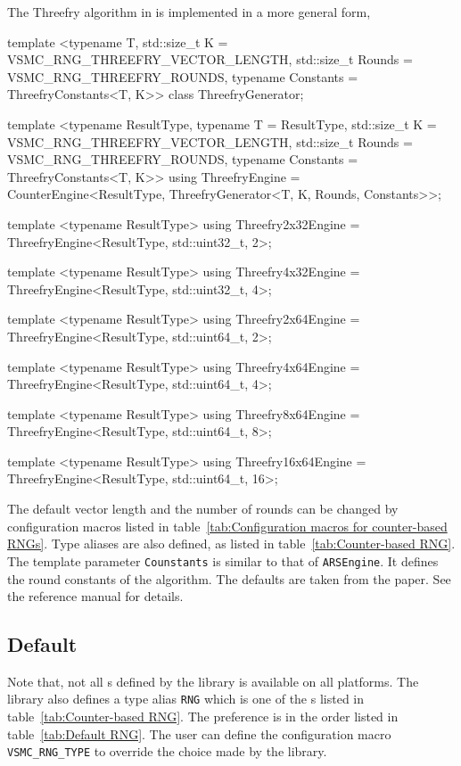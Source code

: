 The Threefry algorithm in \textcite{Salmon:2011um} is implemented in a more
general form,
\begin{cppcode}
  template <typename T, std::size_t K = VSMC_RNG_THREEFRY_VECTOR_LENGTH,
      std::size_t Rounds = VSMC_RNG_THREEFRY_ROUNDS,
      typename Constants = ThreefryConstants<T, K>>
  class ThreefryGenerator;

  template <typename ResultType, typename T = ResultType,
      std::size_t K = VSMC_RNG_THREEFRY_VECTOR_LENGTH,
      std::size_t Rounds = VSMC_RNG_THREEFRY_ROUNDS,
      typename Constants = ThreefryConstants<T, K>>
  using ThreefryEngine =
      CounterEngine<ResultType, ThreefryGenerator<T, K, Rounds, Constants>>;

  template <typename ResultType>
  using Threefry2x32Engine = ThreefryEngine<ResultType, std::uint32_t, 2>;

  template <typename ResultType>
  using Threefry4x32Engine = ThreefryEngine<ResultType, std::uint32_t, 4>;

  template <typename ResultType>
  using Threefry2x64Engine = ThreefryEngine<ResultType, std::uint64_t, 2>;

  template <typename ResultType>
  using Threefry4x64Engine = ThreefryEngine<ResultType, std::uint64_t, 4>;

  template <typename ResultType>
  using Threefry8x64Engine = ThreefryEngine<ResultType, std::uint64_t, 8>;

  template <typename ResultType>
  using Threefry16x64Engine = ThreefryEngine<ResultType, std::uint64_t, 16>;
\end{cppcode}
The default vector length and the number of rounds can be changed by
configuration macros listed in table~\ref{tab:Configuration macros for
  counter-based RNGs}. Type aliases are also defined, as listed in
table~\ref{tab:Counter-based RNG}. The template parameter \verb|Counstants| is
similar to that of \verb|ARSEngine|. It defines the round constants of the
algorithm. The defaults are taken from the paper. See the reference manual for
details.

\subsection{Default \protect\rng}
\label{sub:Default RNG}

Note that, not all \rng{}s defined by the library is available on all
platforms. The library also defines a type alias \verb|RNG| which is one of the
\rng{}s listed in table~\ref{tab:Counter-based RNG}. The preference is in the
order listed in table~\ref{tab:Default RNG}. The user can define the
configuration macro \verb|VSMC_RNG_TYPE| to override the choice made by the
library.

